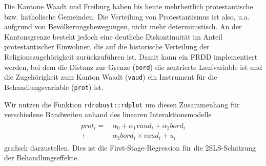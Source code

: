 \documentclass[
  a4paper,
  DIV=11,
  oneside]{scrreprt}
\begin{document}
Die Kantone Waadt und Freiburg haben bis heute mehrheitlich
protestantische bzw. katholische Gemeinden. Die Verteilung von
Protestantismus ist also, u.a. aufgrund von Bevölkerungsbewegungen,
nicht mehr deterministisch. An der Kantonsgrenze besteht jedoch eine
deutliche Diskontinuität im Anteil protestantischer Einwohner, die auf
die historische Verteilung der Religionszugehörigkeit zurückzuführen
ist. Damit kann ein FRDD implementiert werden, bei dem die Distanz zur
Grenze (\texttt{bord}) die zentrierte Laufvariable ist und die
Zugehörigkeit zum Kanton Waadt (\texttt{vaud}) ein Instrument für die
Behandlungsvariable (\texttt{prot}) ist.

Wir nutzen die Funktion \texttt{rdrobust::rdplot} um diesen Zusammenhang
für verschiedene Bandweiten anhand des linearen Interaktionsmodells
\begin{align}
  \begin{split}
  prot_i =&\, \alpha_0 + \alpha_1 vaud_i + \alpha_2 bord_i \\
  +&\, \alpha_3 bord_i \times vaud_i + u_i
  \end{split}\label{eq:BBFSR}
\end{align} grafisch darzustellen. Dies ist die First-Stage-Regression
für die 2SLS-Schätzung der Behandlungseffekte.
\end{document}
